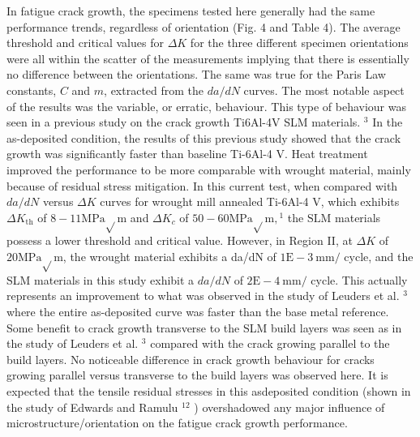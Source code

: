 \documentclass[10pt]{article}
\begin{document}
In fatigue crack growth, the specimens tested here generally had the same performance trends, regardless of orientation (Fig. 4 and Table 4). The average threshold and critical values for $\Delta K$ for the three different specimen orientations were all within the scatter of the measurements implying that there is essentially no difference between the orientations. The same was true for the Paris Law constants, $C$ and $m$, extracted from the $d a / d N$ curves. The most notable aspect of the results was the variable, or erratic, behaviour. This type of behaviour was seen in a previous study on the crack growth Ti6Al-4V SLM materials. ${ }^{3}$ In the as-deposited condition, the results of this previous study showed that the crack growth was significantly faster than baseline Ti-6Al-4 V. Heat treatment improved the performance to be more comparable with wrought material, mainly because of residual stress mitigation. In this current test, when compared with $d a / d N$ versus $\Delta K$ curves for wrought mill annealed Ti-6Al-4 $\mathrm{V}$, which exhibits $\Delta K_{\mathrm{th}}$ of $8-11 \mathrm{MPa} \sqrt{ } \mathrm{m}$ and $\Delta K_{c}$ of $50-60 \mathrm{MPa} \sqrt{ } \mathrm{m},{ }^{1}$ the $\mathrm{SLM}$ materials possess a lower threshold and critical value. However, in Region II, at $\Delta K$ of $20 \mathrm{MPa} \sqrt{ } \mathrm{m}$, the wrought material exhibits a da/dN of $1 \mathrm{E}-3 \mathrm{~mm} /$ cycle, and the SLM materials in this study exhibit a $d a / d N$ of $2 \mathrm{E}-4 \mathrm{~mm} /$ cycle. This actually represents an improvement to what was observed in the study of Leuders et al. ${ }^{3}$ where the entire as-deposited curve was faster than the base metal reference. Some benefit to crack growth transverse to the SLM build layers was seen as in the study of Leuders et al. ${ }^{3}$ compared with the crack growing parallel to the build layers. No noticeable difference in crack growth behaviour for cracks growing parallel versus transverse to the build layers was observed here. It is expected that the tensile residual stresses in this asdeposited condition (shown in the study of Edwards and Ramulu ${ }^{12}$ ) overshadowed any major influence of microstructure/orientation on the fatigue crack growth performance.
\end{document}
